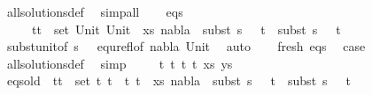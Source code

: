 \begin{isabellebody}
\ all{\isacharunderscore}{\kern0pt}solutions{\isacharunderscore}{\kern0pt}def\ \isamarkupfalse%
\ simp{\isacharunderscore}{\kern0pt}all\isanewline
\ \ \isamarkupfalse%
\ eqs{\isacharcolon}{\kern0pt}\ \isanewline
\ \ \ \ {\isachardoublequoteopen}{\isasymforall}\ {\isacharparenleft}{\kern0pt}t{}{\isacharcomma}{\kern0pt}t{}{\isacharparenright}{\kern0pt}\ {\isasymin}\ set\ {\isacharparenleft}{\kern0pt}{\isacharparenleft}{\kern0pt}Unit{\isacharcomma}{\kern0pt}\ Unit{\isacharparenright}{\kern0pt}\ {\isacharhash}{\kern0pt}\ xs{\isacharparenright}{\kern0pt}{\isachardot}{\kern0pt}\ nabla{}\ {\isasymturnstile}\ subst\ {\isacharparenleft}{\kern0pt}s{}\ {\isasymbullet}\ {\isacharbrackleft}{\kern0pt}{\isacharbrackright}{\kern0pt}{\isacharparenright}{\kern0pt}\ t{}\ {\isasymapprox}\ subst\ {\isacharparenleft}{\kern0pt}s{}\ {\isasymbullet}\ {\isacharbrackleft}{\kern0pt}{\isacharbrackright}{\kern0pt}{\isacharparenright}{\kern0pt}\ t{}{\isachardoublequoteclose}\isanewline
\ \ \ \ \isamarkupfalse%
\ subst{\isacharunderscore}{\kern0pt}unit{\isacharbrackleft}{\kern0pt}of\ {\isacartoucheopen}{\isacharparenleft}{\kern0pt}s{}\ {\isasymbullet}\ {\isacharbrackleft}{\kern0pt}{\isacharbrackright}{\kern0pt}{\isacharparenright}{\kern0pt}{\isacartoucheclose}{\isacharbrackright}{\kern0pt}\ equ{\isacharunderscore}{\kern0pt}refl{\isacharbrackleft}{\kern0pt}of\ nabla{}\ Unit{\isacharbrackright}{\kern0pt}\ \isamarkupfalse%
\ auto\isanewline
\ \ \isamarkupfalse%
\ fresh\ eqs\ \isamarkupfalse%
\ {\isacharquery}{\kern0pt}case\isanewline
\ \ \ \ \isamarkupfalse%
\ all{\isacharunderscore}{\kern0pt}solutions{\isacharunderscore}{\kern0pt}def\ \isamarkupfalse%
\ simp\isanewline
{}\isamarkupfalse%
\isanewline
\ \ \isamarkupfalse%
\ {\isacharparenleft}{\kern0pt}{}\ t{}\ t{}\ t{}\ t{}\ xs\ ys{\isacharparenright}{\kern0pt}\isanewline
\ \ \ \isamarkupfalse%
\ eqs{\isacharunderscore}{\kern0pt}old{\isacharcolon}{\kern0pt}\ {\isachardoublequoteopen}{\isasymforall}\ {\isacharparenleft}{\kern0pt}t{}{\isacharcomma}{\kern0pt}t{}{\isacharparenright}{\kern0pt}\ {\isasymin}\ set\ {\isacharparenleft}{\kern0pt}{\isacharparenleft}{\kern0pt}t{}{\isacharcomma}{\kern0pt}\ t{}{\isacharparenright}{\kern0pt}\ {\isacharhash}{\kern0pt}\ {\isacharparenleft}{\kern0pt}t{}{\isacharcomma}{\kern0pt}\ t{}{\isacharparenright}{\kern0pt}\ {\isacharhash}{\kern0pt}\ xs{\isacharparenright}{\kern0pt}{\isachardot}{\kern0pt}\ nabla{}\ {\isasymturnstile}\ subst\ {\isacharparenleft}{\kern0pt}s{}\ {\isasymbullet}\ {\isacharbrackleft}{\kern0pt}{\isacharbrackright}{\kern0pt}{\isacharparenright}{\kern0pt}\ t{}\ {\isasymapprox}\ subst\ {\isacharparenleft}{\kern0pt}s{}\ {\isasymbullet}\ {\isacharbrackleft}{\kern0pt}{\isacharbrackright}{\kern0pt}{\isacharparenright}{\kern0pt}\ t{}{\isachardoublequoteclose}\ \isanewline

\end{isabellebody}
